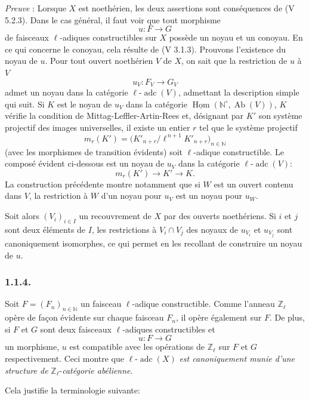\documentclass[11pt]{article}
\DeclareMathOperator{\Hom}{Hom}
\providecommand{\uHom}{\underline{\Hom}}
\providecommand{\Hom}{\operatorname{Hom}}
\providecommand{\Ab}{\operatorname{Ab}}
\providecommand{\adc}{\operatorname{adc}}
\providecommand{\Ab}{\operatorname{Ab}}
\providecommand{\Hom}{\operatorname{Hom}}
\begin{document}
\emph{Preuve} : Lorsque \(X\) est noethérien, les deux assertions sont conséquences de (V 5.2.3). Dans le cas général, il faut voir que tout morphisme
\[
u:F\longrightarrow G
\]
de faisceaux \(\ell\)-adiques constructibles sur \(X\) possède un noyau et un conoyau.
En ce qui
concerne le conoyau, cela résulte de (V 3.1.3). Prouvons l'existence du noyau de \(u\). Pour tout ouvert noethérien \(V\) de \(X\), on sait que la restriction de \(u\) à \(V\)
\[
u_V:F_V\longrightarrow G_V
\]
admet un noyau dans la catégorie \(\ell\text{-}\adc(V)\), admettant la description simple qui suit. Si \(K\) est le noyau de \(u_V\) dans la catégorie \(\uHom(\mathbb N^\circ,\Ab(V))\), \(K\) vérifie la condition de Mittag-Leffler-Artin-Rees et, désignant par \(K'\) son système projectif des images universelles, il existe un entier \(r\) tel que le système projectif
\[
m_r(K')=\bigl(K'_{n+r}/\ell^{\,n+1}K'_{n+r}\bigr)_{n\in\mathbb N}
\]
(avec les morphismes de transition évidents) soit \(\ell\)-adique constructible. Le composé évident ci-dessous est un noyau de \(u_V\) dans la catégorie \(\ell\text{-}\adc(V)\):
\[
m_r(K')\longrightarrow K'\longrightarrow K.
\]
La construction précédente montre notamment que si \(W\) est un ouvert contenu dans \(V\), la restriction à \(W\) d'un noyau pour \(u_V\) est un noyau pour \(u_W\).

Soit alors \((V_i)_{i\in I}\) un recouvrement de \(X\) par des ouverts noethériens. Si \(i\) et \(j\) sont deux éléments de \(I\), les restrictions à \(V_i\cap V_j\) des noyaux de \(u_{V_i}\) et \(u_{V_j}\) sont canoniquement isomorphes, ce qui permet en les recollant de construire un noyau de \(u\).

\subsubsection*{1.1.4.}
Soit \(F=(F_n)_{n\in\mathbb N}\) un faisceau \(\ell\)-adique constructible. Comme l'anneau \(\mathbb Z_\ell\) opère de façon évidente sur chaque faisceau \(F_n\), il opère également sur \(F\). De plus, si \(F\) et \(G\) sont deux faisceaux \(\ell\)-adiques constructibles et
\[
u:F\longrightarrow G
\]
un
morphisme, \(u\) est compatible avec les opérations de \(\mathbb Z_\ell\) sur \(F\) et \(G\) respectivement. Ceci montre que \(\ell\text{-}\adc(X)\) \emph{est canoniquement munie d'une structure de} \(\mathbb Z_\ell\)-\emph{catégorie abélienne}.

Cela justifie la terminologie suivante:
\end{document}

